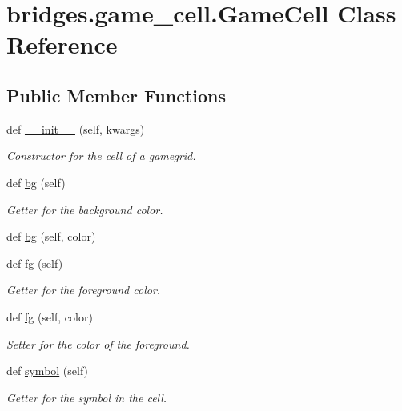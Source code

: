 \hypertarget{classbridges_1_1game__cell_1_1_game_cell}{}\section{bridges.\+game\+\_\+cell.\+Game\+Cell Class Reference}
\label{classbridges_1_1game__cell_1_1_game_cell}
\subsection*{Public Member Functions}
\begin{DoxyCompactItemize}
\item 
def \hyperlink{classbridges_1_1game__cell_1_1_game_cell_a5f604c05c0d42179a09ace913302d57b}{\+\_\+\+\_\+init\+\_\+\+\_\+} (self, kwargs)
\begin{DoxyCompactList}\small\item\em Constructor for the cell of a gamegrid. \end{DoxyCompactList}\item 
def \hyperlink{classbridges_1_1game__cell_1_1_game_cell_a64581c2fd4a7c1da8e302ba9f843aae4}{bg} (self)
\begin{DoxyCompactList}\small\item\em Getter for the background color. \end{DoxyCompactList}\item 
def \hyperlink{classbridges_1_1game__cell_1_1_game_cell_ac500927058f98ad319821d5c89c91246}{bg} (self, color)
\item 
def \hyperlink{classbridges_1_1game__cell_1_1_game_cell_a351a23a7e0c4a8b026ab95bff6c05e35}{fg} (self)
\begin{DoxyCompactList}\small\item\em Getter for the foreground color. \end{DoxyCompactList}\item 
def \hyperlink{classbridges_1_1game__cell_1_1_game_cell_ae49f154ef62b58e70c06b6a1da230acc}{fg} (self, color)
\begin{DoxyCompactList}\small\item\em Setter for the color of the foreground. \end{DoxyCompactList}\item 
def \hyperlink{classbridges_1_1game__cell_1_1_game_cell_adc1c02a52845c2673d43167212574904}{symbol} (self)
\begin{DoxyCompactList}\small\item\em Getter for the symbol in the cell. \end{DoxyCompactList}\item 

\end{DoxyCompactItemize}
